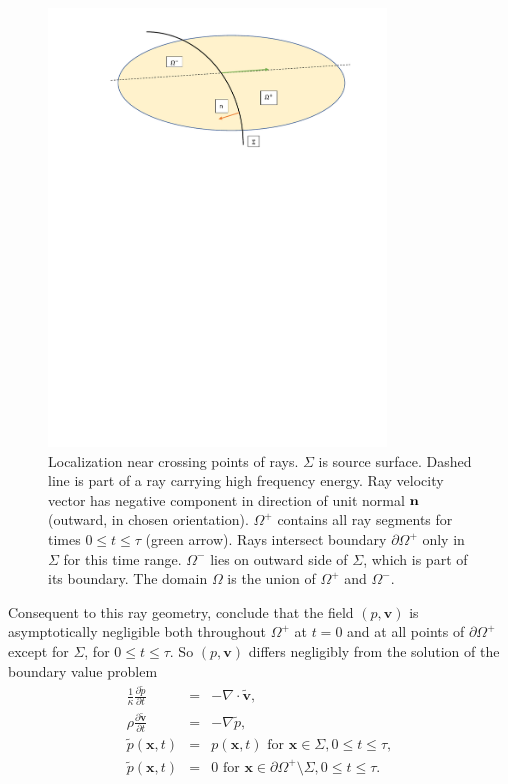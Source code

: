 \documentclass[georeport,12pt]{geophysics}
\newcommand{\bx}{\mathbf{x}}
\newcommand{\bv}{\mathbf{v}}
\begin{document}
\begin{figure}
  \centering
  \includegraphics[width=0.8\textwidth]{omegarays.pdf}
  \caption{Localization near crossing points of rays. $\Sigma$ is
    source surface.  Dashed line is part of a ray carrying high
    frequency energy. Ray velocity vector has negative component in
    direction of unit normal ${\bf n}$ (outward, in chosen
    orientation). $\Omega^+$ contains all ray segments for times
    $0 \le t \le \tau$ (green arrow). Rays intersect boundary
    $\partial \Omega^+$ only in $\Sigma$ for this time
    range. $\Omega^-$ lies on outward side of $\Sigma$, which is part
    of its boundary. The domain $\Omega$ is the union of $\Omega^+$
    and $\Omega^-$.}
  \label{fig:omegarays}
\end{figure}

Consequent to this ray geometry, conclude that the field $(p,\bv)$  is asymptotically negligible both
throughout $\Omega^+$ at $t=0$ and at all points of 
$\partial \Omega^+$ except for $\Sigma$, for $0\le t \le \tau$. So $(p,\bv)$ differs
negligibly from the solution of the boundary value problem 
\begin{eqnarray}
\label{eqn:aweloc}
  \frac{1}{\kappa}\frac{\partial \tilde{p}}{\partial t} & = & - \nabla \cdot \tilde{\bv}, \nonumber \\
  \rho\frac{\partial \tilde{\bv}}{\partial t} & = & - \nabla
                                                    \tilde{p}, \nonumber \\
  \tilde{p}(\bx,t) & = & p(\bx,t) \mbox{ for } \bx \in \Sigma, 0 \le t \le 
  \tau, \nonumber \\
  \tilde{p}(\bx,t) & = & 0 \mbox{ for } \bx \in \partial \Omega^+ \setminus \Sigma, 0 \le t \le
 \tau.
\end{eqnarray}
\end{document}
